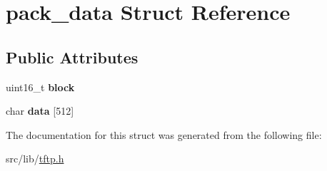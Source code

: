 \hypertarget{structpack__data}{}\section{pack\+\_\+data Struct Reference}
\label{structpack__data}
\subsection*{Public Attributes}
\begin{DoxyCompactItemize}
\item 
uint16\+\_\+t {\bfseries block}\hypertarget{structpack__data_a068c6d09f17d908c17125d340ce6d395}{}\label{structpack__data_a068c6d09f17d908c17125d340ce6d395}

\item 
char {\bfseries data} \mbox{[}512\mbox{]}\hypertarget{structpack__data_a8544d11ed274e1889f67d2451fe6906d}{}\label{structpack__data_a8544d11ed274e1889f67d2451fe6906d}

\end{DoxyCompactItemize}


The documentation for this struct was generated from the following file\+:\begin{DoxyCompactItemize}
\item 
src/lib/\hyperlink{tftp_8h}{tftp.\+h}\end{DoxyCompactItemize}
